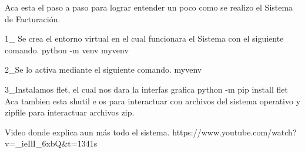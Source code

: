 Aca esta el paso a paso para lograr entender un poco como se realizo el Sistema de Facturación.

1_ Se crea el entorno virtual en el cual funcionara el Sistema con el siguiente comando.
python -m venv myvenv

2_Se lo activa mediante el siguiente comando.
myvenv\Scripts\activate

3_Instalamos flet, el cual nos dara la interfas grafica 
python -m pip install flet
Aca tambien esta shutil e os para interactuar con archivos del sistema operativo y zipfile para interactuar
archivos zip.

Video donde explica aun más todo el sistema.
https://www.youtube.com/watch?v=_ieIlI_6xbQ&t=1341s 
